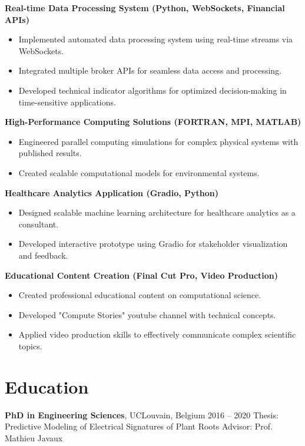 \documentclass[11pt,a4paper]{article}
\begin{document}
\textbf{Real-time Data Processing System (Python, WebSockets, Financial APIs)}
\begin{itemize}[leftmargin=*]
    \item Implemented automated data processing system using real-time streams via WebSockets.
    \item Integrated multiple broker APIs for seamless data access and processing.
    \item Developed technical indicator algorithms for optimized decision-making in time-sensitive applications.
\end{itemize}

\textbf{High-Performance Computing Solutions (FORTRAN, MPI, MATLAB)}
\begin{itemize}[leftmargin=*]
    \item Engineered parallel computing simulations for complex physical systems with published results.
    \item Created scalable computational models for environmental systems.
\end{itemize}

\textbf{Healthcare Analytics Application (Gradio, Python)}
\begin{itemize}[leftmargin=*]
    \item Designed scalable machine learning architecture for healthcare analytics as a consultant.
    \item Developed interactive prototype using Gradio for stakeholder visualization and feedback.
\end{itemize}

\textbf{Educational Content Creation (Final Cut Pro, Video Production)}
\begin{itemize}[leftmargin=*]
    \item Created professional educational content on computational science.
    \item Developed "Compute Stories" youtube channel with technical concepts.
    \item Applied video production skills to effectively communicate complex scientific topics.
\end{itemize}

\newpage
\section*{Education}
\textbf{PhD in Engineering Sciences}, UCLouvain, Belgium \hfill 2016 -- 2020  
Thesis: Predictive Modeling of Electrical Signatures of Plant Roots  
Advisor: Prof. Mathieu Javaux  
\end{document}
